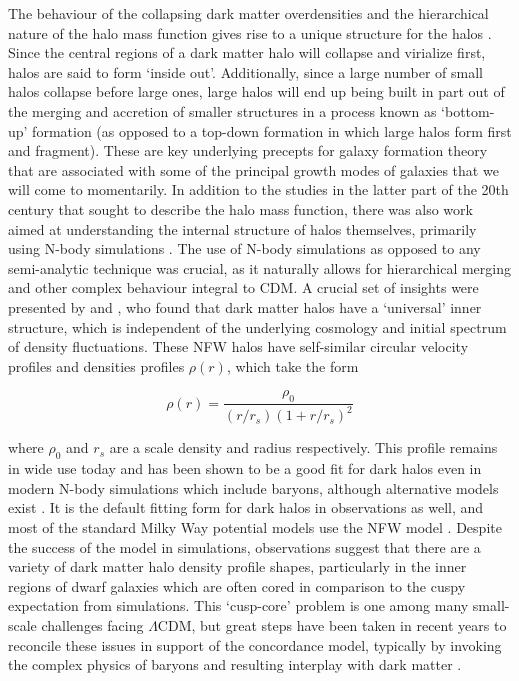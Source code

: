 The behaviour of the collapsing dark matter overdensities and the hierarchical nature of the halo mass function gives rise to a unique structure for the halos \parencite[e.g.][]{frenk85,frenk88}. Since the central regions of a dark matter halo will collapse and virialize first, halos are said to form `inside out'. Additionally, since a large number of small halos collapse before large ones, large halos will end up being built in part out of the merging and accretion of smaller structures in a process known as `bottom-up' formation (as opposed to a top-down formation in which large halos form first and fragment). These are key underlying precepts for galaxy formation theory that are associated with some of the principal growth modes of galaxies that we will come to momentarily. In addition to the studies in the latter part of the 20th century that sought to describe the halo mass function, there was also work aimed at understanding the internal structure of halos themselves, primarily using N-body simulations \parencite[e.g.][]{efstathiou88,dubinski91}. The use of N-body simulations as opposed to any semi-analytic technique was crucial, as it naturally allows for hierarchical merging and other complex behaviour integral to CDM. A crucial set of insights were presented by \textcite{navarro96} and \textcite{navarro97}, who found that dark matter halos have a `universal' inner structure, which is independent of the underlying cosmology and initial spectrum of density fluctuations. These NFW halos have self-similar circular velocity profiles and densities profiles $\rho(r)$, which take the form

\begin{equation}
    \label{ch1:eq:nfw}
    \rho(r) = \frac{\rho_{0}}{(r/r_{s})(1 + r/r_{s})^{2}}
\end{equation}

\noindent where $\rho_{0}$ and $r_{s}$ are a scale density and radius respectively. This profile remains in wide use today and has been shown to be a good fit for dark halos even in modern N-body simulations which include baryons, although alternative models exist \parencite[e.g.][]{einasto65}. It is the default fitting form for dark halos in observations as well, and most of the standard Milky Way potential models use the NFW model \parencite[e.g.][]{bovy15,mcmillan17}. Despite the success of the model in simulations, observations suggest that there are a variety of dark matter halo density profile shapes, particularly in the inner regions of dwarf galaxies which are often cored in comparison to the cuspy expectation from simulations. This `cusp-core' problem \parencite[see][for a summary]{bullock17} is one among many small-scale challenges facing $\Lambda$CDM, but great steps have been taken in recent years to reconcile these issues in support of the concordance model, typically by invoking the complex physics of baryons and resulting interplay with dark matter \parencite[see][for a recent perspective]{sales22}.

